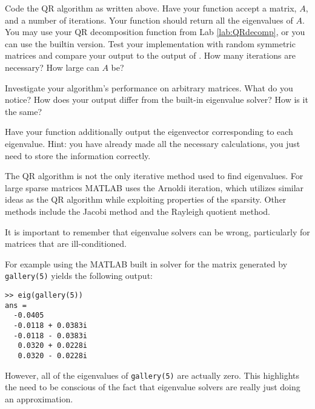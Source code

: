 \begin{problem}
Code the QR algorithm as written above. Have your function accept a matrix, $A$, and a number of iterations. Your function should return all the eigenvalues of $A$. You may use your QR decomposition function from Lab \ref{lab:QRdecomp}, or you can use the builtin version. Test your implementation with random symmetric matrices and compare your output to the output of . How many iterations are necessary? How large can $A$ be?
\end{problem}

\begin{problem}
Investigate your algorithm's performance on arbitrary matrices. What do you notice? How does your output differ from the built-in eigenvalue solver? How is it the same?
\end{problem}

\begin{problem}
Have your function additionally output the eigenvector corresponding to each eigenvalue. Hint: you have already made all the necessary calculations, you just need to store the information correctly.
\end{problem}

The QR algorithm is not the only iterative method used to find eigenvalues. For large sparse matrices MATLAB uses the Arnoldi iteration, which utilizes similar ideas as the QR algorithm while exploiting properties of the sparsity. Other methods include the Jacobi method and the Rayleigh quotient method.

It is important to remember that eigenvalue solvers can be wrong, particularly for matrices that are ill-conditioned. 
\begin{matlab}
For example using the MATLAB built in solver for the matrix generated by {\tt gallery(5)} yields the following output:
\begin{lstlisting}[style=matlab]
>> eig(gallery(5))
ans =
  -0.0405          
  -0.0118 + 0.0383i
  -0.0118 - 0.0383i
   0.0320 + 0.0228i
   0.0320 - 0.0228i
\end{lstlisting}

However, all of the eigenvalues of {\tt gallery(5)} are actually zero. This highlights the need to be conscious of the fact that eigenvalue solvers are really just doing an approximation.
\end{matlab}